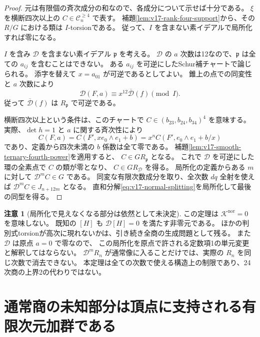 \documentclass[a4paper,11pt]{ltjsarticle}
\newcommand{\mathscr}{\mathcal}
\theoremstyle{definition}
\newtheorem{remark}[theorem]{注意}
\begin{document}
\begin{proof}
元は有限個の斉次成分の和なので、各成分について示せば十分である。
$\xi$ を横断四次以上の $C\in\mathcal C_n^{\ge4}$ で表す。
補題\ref{lem:v17-rank-four-support}から、その $R/G$ における類は $I$-torsionである。
従って、$I$ を含まない素イデアルで局所化すれば零になる。

$I$ を含み $\mathscr D$ を含まない素イデアル $\mathfrak p$ を考える。
$\mathscr D$ の $a$ 次数は12なので、$\mathfrak p$ は全ての $a_{ij}$ を含むことはできない。
ある $a_{ij}$ を可逆にしたSchur補チャートで論じられる。
添字を替えて $x=a_{01}$ が可逆であるとしてよい。
錐上の点での同変性と $a$ 次数により
\[
 \mathscr D(F,a)\equiv x^{12}\overline{\mathscr D}(f)\pmod I.
\]
従って $\overline{\mathscr D}(f)$ は $R_{\mathfrak p}$ で可逆である。

横断四次以上という条件は、このチャートで
$C\in(b_{23},b_{24},b_{34})^4$ を意味する。
実際、$\det h=1$ と $a$ に関する斉次性により
\[
 C(F,a)=C(F',xe_0\wedge e_1+b)
       =x^n C(F',e_0\wedge e_1+b/x)
\]
であり、定義から四次未満の $b$ 係数は全て零である。
補題\ref{lem:v17-smooth-ternary-fourth-power}を適用すると、
$C\in GR_{\mathfrak p}$ となる。
これで $\mathscr D$ を可逆にした環の全素点で $C$ の類が零となり、
$C\in GR_{\mathscr D}$ を得る。
局所化の定義からある $m$ に対して $\mathscr D^mC\in G$ である。
同変な有限次数成分を取り、全次数 $dq$ 全射を使えば
$\mathscr D^mC\in J_{n+12m}$ となる。
直和分解\eqref{eq:v17-normal-splitting}を局所化して最後の同型を得る。
\end{proof}

\begin{remark}[局所化で見えなくなる部分は依然として未決定]
この定理は $\mathcal K^{\mathrm{nor}}=0$ を意味しない。
既知の $[H]$ も $\mathscr D[H]=0$ を満たす非零元である。
ほかの判別式torsionが高次に現れないかは、引き続き全商の生成問題として残る。
また $\mathscr D$ は原点 $a=0$ で零なので、
この局所化を原点で許される定数項1の単元変更と解釈してはならない。
$\mathscr D^mR_n$ が通常像に入ることだけでは、実際の $R_n$ を同じ次数で消去できない。
本定理は全ての次数で使える構造上の制限であり、24次商の上界2の代わりではない。
\end{remark}




\section{通常商の未知部分は頂点に支持される有限次元加群である}
\label{sec:v17-vertex-finiteness}
\end{document}
